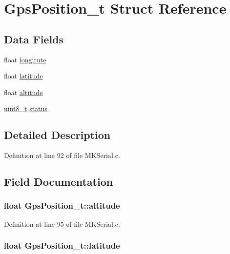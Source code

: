 \hypertarget{struct_gps_position__t}{\section{Gps\-Position\-\_\-t Struct Reference}
\label{struct_gps_position__t}
}
\subsection*{Data Fields}
\begin{DoxyCompactItemize}
\item 
float \hyperlink{struct_gps_position__t_abc6f957f20562e71c08d3866299e9004}{longitute}
\item 
float \hyperlink{struct_gps_position__t_a002aedbbda6c23b83e8cca4f54f98fe0}{latitude}
\item 
float \hyperlink{struct_gps_position__t_a93ae5cac2cd9252ec2dee6a0430d0565}{altitude}
\item 
\hyperlink{stdint_8h_aba7bc1797add20fe3efdf37ced1182c5}{uint8\-\_\-t} \hyperlink{struct_gps_position__t_ad572bd9feb6186a48213e2db99c86883}{status}
\end{DoxyCompactItemize}


\subsection{Detailed Description}


Definition at line 92 of file M\-K\-Serial.\-c.



\subsection{Field Documentation}
\hypertarget{struct_gps_position__t_a93ae5cac2cd9252ec2dee6a0430d0565}{
\subsubsection[{altitude}]{\setlength{\rightskip}{0pt plus 5cm}float Gps\-Position\-\_\-t\-::altitude}}\label{struct_gps_position__t_a93ae5cac2cd9252ec2dee6a0430d0565}


Definition at line 95 of file M\-K\-Serial.\-c.

\hypertarget{struct_gps_position__t_a002aedbbda6c23b83e8cca4f54f98fe0}{
\subsubsection[{latitude}]{\setlength{\rightskip}{0pt plus 5cm}float Gps\-Position\-\_\-t\-::latitude}}\label{struct_gps_position__t_a002aedbbda6c23b83e8cca4f54f98fe0}


